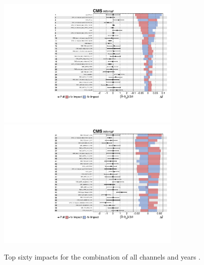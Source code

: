 \begin{figure}[ht]
    \begin{center}
        \includegraphics[width=0.8\textwidth]{figures/ch-11-systematic-uncertainties/impacts-all-1.pdf}\\
        \includegraphics[width=0.8\textwidth]{figures/ch-11-systematic-uncertainties/impacts-all-2.pdf}
    \end{center}
    \caption[Top sixty impacts for the combination of all channels and years.]{Top sixty impacts for the combination of all channels and years \cite{CMS-AN-20-213}.}
    \label{fig:impacts_pages_1_2}
\end{figure}
